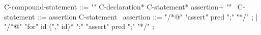 \begin{syntax}
  C-compound-statement ::= "{" C-declaration* C-statement* assertion+ "}"
        \
  C-statement ::= assertion C-statement \
  assertion ::= "/*@" "assert" pred ";" "*/" ;
  | "/*@" "for" id ("," id)* ":" "assert" pred ";" "*/" ;
\end{syntax}
